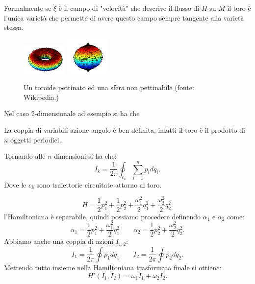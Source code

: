 \noindent
Formalmente se $\dot{\xi}$ è il campo di "velocità" che descrive il flusso di $H$ su $M$ il toro è l'unica varietà che permette di avere questo campo sempre tangente alla varietà stessa. 
\begin{figure}[H]
    \centering
    \includegraphics[width=0.2\textwidth]{figures/toroide_peloso.png}
    \includegraphics[width=0.2\textwidth]{figures/sfera_non_pettinabile}
    \caption{\scriptsize Un toroide pettinato ed una sfera non pettinabile (fonte: Wikipedia.)}
    \label{fig:figures-sfera_non_pettinabile}
\end{figure}
Nel caso 2-dimensionale ad esempio si ha che
\begin{redbox}{}
    La coppia di variabili azione-angolo è ben definita, infatti il toro è il prodotto di $n$ oggetti periodici.
\end{redbox}
\noindent
Tornando alle $n$ dimensioni si ha che:
\[
    I_k = \frac{1}{2\pi}\oint _{c_k} \sum_{i=1}^{n} p_idq_i
.\] 
Dove le $c_k $ sono traiettorie circuitate attorno al toro.\\
\begin{exmp}
   \[
       H = \frac{1}{2}p_1^2+\frac{1}{2}p_2^2 + \frac{\omega_1^2}{2}q_1^2 + \frac{\omega_2^2}{2}q_2^2
   .\]  
   l'Hamiltoniana è separabile, quindi possiamo procedere definendo $\alpha_1$ e $\alpha_2$ come:
   \[
       \alpha_1 = \frac{1}{2}p_1^2+ \frac{\omega_1^2}{2}q_1^2 \qquad \alpha_2 = \frac{1}{2}p_2^2+ \frac{\omega_2^2}{2}q_2^2
   .\] 
   Abbiamo anche una coppia di azioni $I_{1,2}$:
   \[
       I_1 = \frac{1}{2\pi}\oint p_1dq_1 \qquad I_2 = \frac{1}{2\pi}\oint p_2dq_2 
   .\] 
   Mettendo tutto insieme nella Hamiltoniana trasformata finale si ottiene:
   \[
       H'(I_1,I_2) = \omega_1I_1+\omega_2I_2
   .\] 
\end{exmp}
\noindent
